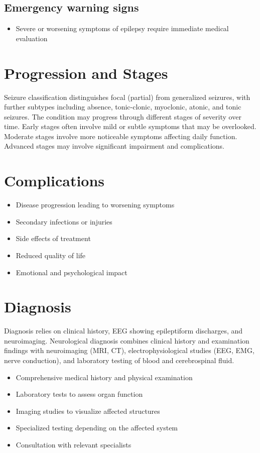 \subsection{Emergency warning signs}
\begin{itemize}[noitemsep]
  \item Severe or worsening symptoms of epilepsy require immediate medical evaluation
\end{itemize}
\section{Progression and Stages}
Seizure classification distinguishes focal (partial) from generalized seizures, with further subtypes including absence, tonic-clonic, myoclonic, atonic, and tonic seizures. The condition may progress through different stages of severity over time. Early stages often involve mild or subtle symptoms that may be overlooked. Moderate stages involve more noticeable symptoms affecting daily function. Advanced stages may involve significant impairment and complications.
\section{Complications}
\begin{itemize}[noitemsep]
  \item Disease progression leading to worsening symptoms
  \item Secondary infections or injuries
  \item Side effects of treatment
  \item Reduced quality of life
  \item Emotional and psychological impact
\end{itemize}
\section{Diagnosis}
Diagnosis relies on clinical history, EEG showing epileptiform discharges, and neuroimaging. Neurological diagnosis combines clinical history and examination findings with neuroimaging (MRI, CT), electrophysiological studies (EEG, EMG, nerve conduction), and laboratory testing of blood and cerebrospinal fluid.

\begin{itemize}[noitemsep]
  \item Comprehensive medical history and physical examination
  \item Laboratory tests to assess organ function
  \item Imaging studies to visualize affected structures
  \item Specialized testing depending on the affected system
  \item Consultation with relevant specialists
\end{itemize}
